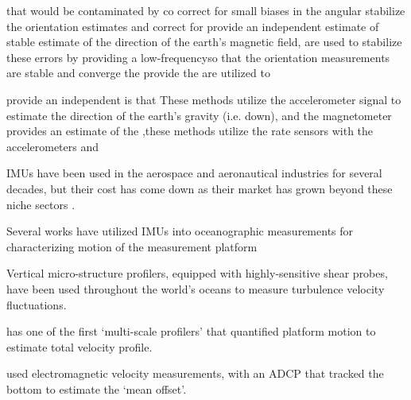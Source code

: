 that would be contaminated by  co correct for small biases in the angular stabilize the orientation estimates and correct for  provide an independent estimate of  stable estimate of the direction of the earth's magnetic field, are used to stabilize these errors by providing a low-frequencyso that the orientation measurements are stable and converge the provide  the are utilized to 

 provide an independent   is that These methods utilize the accelerometer signal to estimate the direction of the earth's gravity (i.e. down), and the magnetometer provides an estimate of the  ,these methods utilize the rate sensors with the accelerometers and 

IMUs have been used in the aerospace and aeronautical industries for several decades, but their cost has come down as their market has grown beyond these niche sectors \cite[]{Bevly2004}.

Several works have utilized IMUs into oceanographic measurements for characterizing motion of the measurement platform


Vertical micro-structure profilers, equipped with highly-sensitive shear probes, have been used throughout the world's oceans to measure turbulence velocity fluctuations. 



\cite[]{Winkel++1996} has one of the first `multi-scale profilers' that quantified platform motion to estimate total velocity profile.

\cite[]{Stahr+Sanford1999} used electromagnetic velocity measurements, with an ADCP that tracked the bottom to estimate the `mean offset'. 

